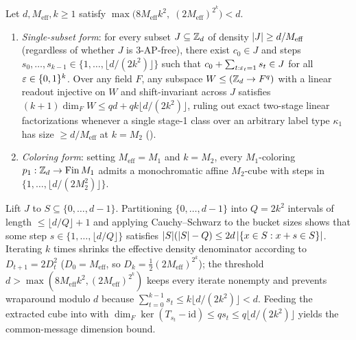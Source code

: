 \begin{lemma}\label{lem:cs-cube}
Let $d, M_{\mathrm{eff}}, k \ge 1$ satisfy $\max\bigl(8 M_{\mathrm{eff}} k^2,\;
(2 M_{\mathrm{eff}})^{2^k}\bigr) < d$.
\begin{enumerate}[label=(\alph*)]
\item \emph{Single-subset form}: for every subset $J \subseteq \mathbb{Z}_d$ of density $\lvert J \rvert \ge
  d / M_{\mathrm{eff}}$ (regardless of whether $J$ is $3$-AP-free), there exist $c_0 \in J$ and
  steps $s_0, \dots, s_{k-1} \in \{1, \dots, \lfloor d/(2k^2)\rfloor\}$ such that
  $c_0 + \sum_{t : \varepsilon_t = 1} s_t \in J$ for all $\varepsilon \in \{0,1\}^k$. Over any field $F$, any
  subspace $W \le (\mathbb{Z}_d \to F^q)$ with a linear readout injective on $W$ and shift-invariant across
  $J$ satisfies $(k + 1)\dim_F W \le q d + q k \lfloor d / (2 k^2)\rfloor$, ruling out exact
  two-stage linear factorizations whenever a single stage-1 class over an arbitrary label type
  $\kappa_1$ has size $\ge d / M_{\mathrm{eff}}$ at $k = M_2$
  ().
\item \emph{Coloring form}: setting $M_{\mathrm{eff}} = M_1$ and $k = M_2$, every $M_1$-coloring
  $p_1 : \mathbb{Z}_d \to \mathrm{Fin}\,M_1$ admits a monochromatic affine $M_2$-cube with steps in
  $\{1, \dots, \lfloor d/(2 M_2^2)\rfloor\}$.
\end{enumerate}
\end{lemma}
\begin{outline}
Lift $J$ to $S \subseteq \{0,\dots,d-1\}$. Partitioning $\{0,\dots,d-1\}$ into $Q = 2k^2$ intervals
of length $\le \lfloor d/Q\rfloor + 1$ and applying Cauchy--Schwarz to the bucket sizes shows that
some step $s \in \{1, \dots, \lfloor d/Q\rfloor\}$ satisfies
$\lvert S \rvert(\lvert S \rvert - Q) \le 2d\,\lvert \{x \in S : x + s \in S\} \rvert$. Iterating $k$ times shrinks the
effective density denominator according to $D_{t+1} = 2 D_t^2$ ($D_0 = M_{\mathrm{eff}}$, so
$D_k = \frac{1}{2}(2 M_{\mathrm{eff}})^{2^k}$); the threshold $d > \max(8 M_{\mathrm{eff}} k^2,
(2M_{\mathrm{eff}})^{2^k})$ keeps every iterate nonempty and prevents wraparound modulo $d$ because
$\sum_{t=0}^{k-1} s_t \le k \lfloor d/(2k^2)\rfloor < d$. Feeding the extracted cube into
 with $\dim_F\ker(T_{s_t} - \mathrm{id}) \le q s_t \le q\lfloor d/(2k^2)\rfloor$
yields the common-message dimension bound.
\end{outline}

